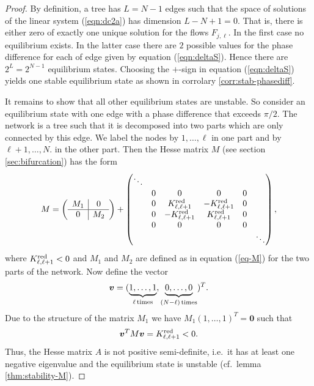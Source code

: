\documentclass[10pt,aps,pre,preprint,superscriptaddress]{revtex4-1}
\newcommand{\be}{\begin{equation}}
\newcommand{\ee}{\end{equation}}
\renewcommand{\vec}[1]{\boldsymbol{#1}}
\begin{document}
\begin{proof}
By definition, a tree has $L=N-1$ edges such that the
space of solutions of the linear system (\ref{eqn:dc2a}) 
has dimension $L-N+1 = 0$. That is, there is either zero
of exactly one unique solution for the flows $F_{j,\ell}$.
In the first case no equilibrium exists. In the latter case
there are $2$ possible values for the phase difference 
for each of edge given by equation (\ref{eqn:deltaS}).
Hence there are $2^L = 2^{N-1}$ equilibrium states.
Choosing the $+$-sign in equation (\ref{eqn:deltaS}) 
yields one stable equilibrium state as shown in corrolary 
\ref{corr:stab-phasediff}.

It remains to show that all other equilibrium states are unstable.
So consider an equilibrium state with one edge with a phase difference 
that exceeds $\pi/2$. The network is a tree such that it is decomposed
into two parts which are only connected by this edge. We label the
nodes by $1,\ldots,\ell$ in one part and by $\ell+1,\ldots,N$.
in the other part. Then the Hesse matrix $M$ 
(see section \ref{sec:bifurcation})
has the form
\be
    M  = \left( \begin{array}{c|c}
    M_1 & 0     \\   \hline
    0 & M_2 \\ 
   \end{array} \right) +
    \begin{pmatrix}
       \ddots & & & & \\
       & 0 &0 & 0 & 0 &  \\
        & 0 & K^{\rm red}_{\ell,\ell +1} & -K^{\rm red}_{\ell,\ell +1} & 0 & \\
        & 0 & -K^{\rm red}_{\ell,\ell +1} & K^{\rm red}_{\ell,\ell +1} & 0 & \\
       & 0 & 0 & 0 & 0 & \\
      &  &  & & & \ddots \\
  \end{pmatrix}, 
\ee
where $K^{\rm red}_{\ell,\ell +1} < 0$
and $M_1$ and $M_2$ are defined as in equation
(\ref{eq-M}) for the two parts of the network.
Now define the vector
\be
   \vec v = ( \underbrace{1,\ldots,1}_{\ell \, {\rm times}},
                     \underbrace{0,\ldots,0}_{(N-\ell) \, {\rm times}} )^T.
\ee
Due to the structure of the matrix $M_1$ we have 
$M_1 (1,\ldots,1)^T = \vec 0$ such that
\be
   \vec v^T M \vec v =  K^{\rm red}_{\ell,\ell +1} < 0.
\ee
Thus, the Hesse matrix $A$ is not positive semi-definite, 
i.e.~it has at least one negative eigenvalue and the 
equilibrium state is unstable (cf.~lemma \ref{thm:stability-M}).
\end{proof}
\end{document}
